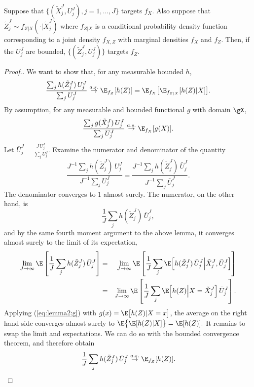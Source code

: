 \begin{lem}
    \label{lem:marginal-proper-weights}
    Suppose that $\{(\tilde X_j^J,U_j^J),j=1,\dots,J\}$ targets $f_X$. Also suppose that $\tilde Z_j^J \sim f_{Z|X}(\cdot | \tilde X_j^J)$ where $f_{Z|X}$ is a conditional probability density function corresponding to a joint density $f_{X,Z}$ with marginal densities $f_X$ and $f_Z$. Then, if the $U_j^J$ are bounded, $\{(\tilde Z_j^J,U_j^J)\}$ targets $f_Z$.
\end{lem}
\begin{proof}[Proof.]
    We want to show that, for any measurable bounded $h$, 
     \begin{equation}
     \frac{\sum_j h(\tilde Z_j^J) \, U_j^J}{\sum_j U_j^J} \stackrel{a.s.}{\to} \E_{f_Z}[h(Z)] = \E_{f_X}\big[\E_{f_{Z|X}}[h(Z) | X]\big].
     \end{equation}
    By assumption, for any measurable and bounded functional $g$ with domain $\gX$,
    \begin{equation}\label{eq:lemma2:g}
    \frac{\sum_j g(\tilde X_j^J)\, U_j^J}{\sum_j U_j^J} \stackrel{a.s.}{\to} \E_{f_X}[g(X)].
    \end{equation}
    Let $\bar{U}_j^J = \frac{J \, U_j^J}{\sum_j U_j^J}$. Examine the numerator and denominator of the quantity \begin{equation}\frac{J^{-1}\sum_j h(\tilde Z_j^J) \, U_j^J}{J^{-1}\sum_j U_j^J} = \frac{J^{-1}\sum_j h(\tilde Z_j^J) \, \bar{U}_j^J}{J^{-1}\sum_j \bar{U}_j^J}.\end{equation}
    The denominator converges to $1$ almost surely. The numerator, on the other hand, is
    \begin{equation}
    \frac{1}{J}\sum_j h(\tilde Z_j^J)\, \bar{U}_j^J,
    \end{equation}
    and by the same fourth moment argument to the above lemma, it converges almost surely to the limit of its expectation,
    \begin{eqnarray}        
    \lim_{J\to\infty} \E\left[\frac{1}{J}\sum_j h(\tilde Z_j^J)\, \bar{U}_j^J\right] 
    &=& \lim_{J\to\infty} \E \left[\frac{1}{J}\sum_j  
      \E\Big[ h(\tilde Z_j^J)\, \bar{U}_j^J\Big|\tilde X_j^J, \bar U_j^J\Big]
    \right]
    \\
    &=& \lim_{J\to\infty} \E \left[\frac{1}{J}\sum_j  \E\Big[h(Z) \Big| X=\tilde X_j^J \Big] \, \bar U_j^J\right].
    \end{eqnarray}
    Applying (\ref{eq:lemma2:g}) with $g(x) = \E\big[h(Z) | X=x\big]$, the average on the right hand side converges almost surely to $\E\big\{\E[h(Z)|X]\big\}=\E[h(Z)].$
    It remains to swap the limit and expectations. We can do so with the bounded convergence theorem, and therefore obtain   
    \begin{equation}\frac{1}{J}\sum_j h(\tilde Z_j^J)\,\bar{U}_j^J \stackrel{a.s.}{\to} \E_{f_Z}[h(Z)].\end{equation} 
    \end{proof}

